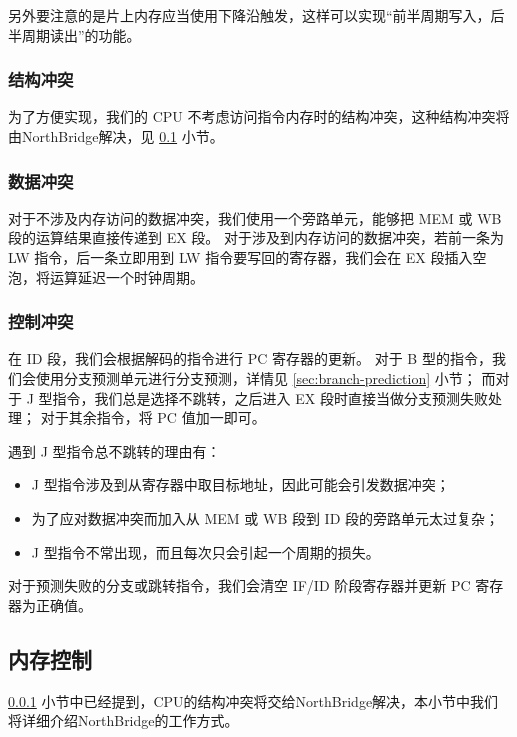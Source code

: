 \documentclass{article}
\begin{document}
另外要注意的是片上内存应当使用下降沿触发，这样可以实现``前半周期写入，后半周期读出''的功能。

\subsubsection{结构冲突}\label{sec:conflict}

为了方便实现，我们的 CPU 不考虑访问指令内存时的结构冲突，这种结构冲突将由NorthBridge解决，见 \ref{sec:memory} 小节。

\subsubsection{数据冲突}

对于不涉及内存访问的数据冲突，我们使用一个旁路单元，能够把 MEM 或 WB 段的运算结果直接传递到 EX 段。
对于涉及到内存访问的数据冲突，若前一条为 LW 指令，后一条立即用到 LW 指令要写回的寄存器，我们会在 EX 段插入空泡，将运算延迟一个时钟周期。

\subsubsection{控制冲突}

在 ID 段，我们会根据解码的指令进行 PC 寄存器的更新。
对于 B 型的指令，我们会使用分支预测单元进行分支预测，详情见 \ref{sec:branch-prediction} 小节；
而对于 J 型指令，我们总是选择不跳转，之后进入 EX 段时直接当做分支预测失败处理；
对于其余指令，将 PC 值加一即可。

遇到 J 型指令总不跳转的理由有：
\begin{itemize}
    \item J 型指令涉及到从寄存器中取目标地址，因此可能会引发数据冲突；
    \item 为了应对数据冲突而加入从 MEM 或 WB 段到 ID 段的旁路单元太过复杂；
    \item J 型指令不常出现，而且每次只会引起一个周期的损失。
\end{itemize}

对于预测失败的分支或跳转指令，我们会清空 IF/ID 阶段寄存器并更新 PC 寄存器为正确值。

\subsection{内存控制}\label{sec:memory}

\ref{sec:conflict} 小节中已经提到，CPU的结构冲突将交给NorthBridge解决，本小节中我们将详细介绍NorthBridge的工作方式。
\end{document}
